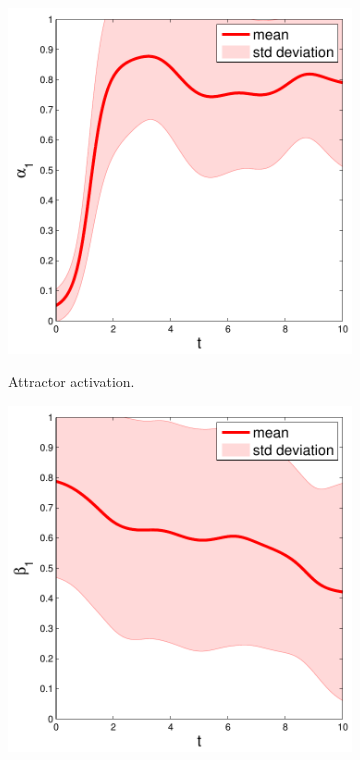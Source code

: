 \documentclass[final,5p,twocolumn]{elsarticle}
\begin{document}
\begin{figure}%

\begin{subfigure}{.3\linewidth}
  \centering
  \includegraphics[width=\linewidth]{./sections/WP4/pics_serena/alpha1}
  \label{fig:alpha1}
  \caption{Attractor activation.}
\end{subfigure}%
\begin{subfigure}{.3\linewidth}
  \centering
  \includegraphics[width=\linewidth]{./sections/WP4/pics_serena/alpha2}

\end{subfigure}
\end{figure}
\end{document}
